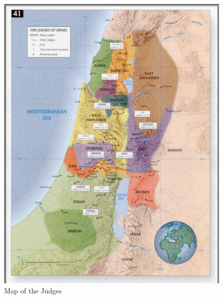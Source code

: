 \newpage
\begin{figure}
\begin{center}
\includegraphics[scale=0.8, angle=0]{07OT-Judges/References/7.Map-Judges}
\caption[Map of the Judges]{Map of the Judges}
\label{fig:Map of the Judges}
\end{center}
\end{figure}


